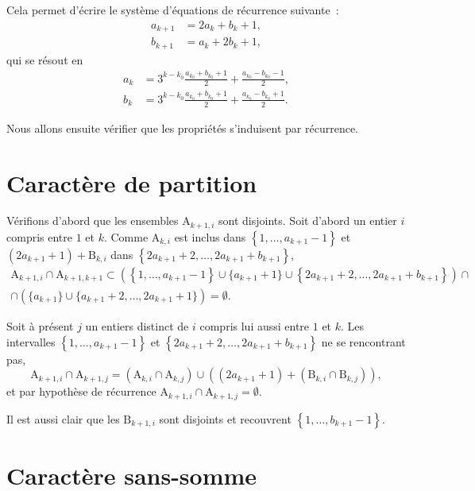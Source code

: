 \documentclass[11pt, oneside]{article}   	%
\newcommand{\interval}[2]{\left\{ #1, \dots, #2 \right\}}
\begin{document}
Cela permet d'écrire le système d'équations de récurrence suivante~:
\begin{align}
 a_{k+1} &= 2 a_k + b_k + 1, \\
 b_{k+1} &= a_k + 2 b_k + 1,
\end{align}
qui se résout en
\begin{align}
 a_k &= 3^{k - k_0} \frac{a_{k_0} + b_{k_0} + 1}{2} + \frac{a_{k_0} - b_{k_0} - 1}{2}, \\
 b_k &= 3^{k - k_0} \frac{a_{k_0} + b_{k_0} + 1}{2} + \frac{a_{k_0} - b_{k_0} + 1}{2}.
\end{align}

Nous allons ensuite vérifier que les propriétés s'induisent par récurrence.

\section{Caractère de partition}

Vérifions d'abord que les ensembles $\mathrm{A}_{k+1, i}$ sont disjoints.
Soit d'abord un entier $i$ compris entre $1$ et $k$.
Comme $\mathrm{A}_{k, i}$ est inclus dans $\interval{1}{a_{k+1} - 1}$
et $(2 a_{k+1} + 1) + \mathrm{B}_{k, i}$ dans $\interval{2 a_{k+1} + 2}{2a_{k+1} + b_{k+1}}$,
\begin{multline}
 \mathrm{A}_{k+1, i} \cap \mathrm{A}_{k+1, k+1} \subset \left( \interval{1}{a_{k+1} - 1} \cup \{a_{k+1} + 1\} \cup \interval{2 a_{k+1} + 2}{2a_{k+1} + b_{k+1}} \right) \cap \\
  \cap \left( \{ a_{k + 1} \} \cup \{ a_{k+1} + 2, \dots, 2 a_{k+1} + 1\} \right) = \emptyset.
\end{multline}

Soit à présent $j$ un entiers distinct de $i$ compris lui aussi entre $1$ et $k$.
Les intervalles $\interval{1}{a_{k+1} - 1}$ et $\interval{2 a_{k+1} + 2}{2a_{k+1} + b_{k+1}}$ ne se rencontrant pas,
\begin{equation}
 \mathrm{A}_{k+1, i} \cap \mathrm{A}_{k+1, j} = \left( \mathrm{A}_{k, i} \cap \mathrm{A}_{k, j} \right)
  \cup \left( (2 a_{k+1} + 1) + \left( \mathrm{B}_{k, i} \cap \mathrm{B}_{k, j} \right)  \right),
\end{equation}
et par hypothèse de récurrence $\mathrm{A}_{k+1, i} \cap \mathrm{A}_{k+1, j} = \emptyset$.

Il est aussi clair que les $\mathrm{B}_{k+1, i}$ sont disjoints et recouvrent $\interval{1}{b_{k+1} - 1}$.

\section{Caractère sans-somme}
\end{document}
